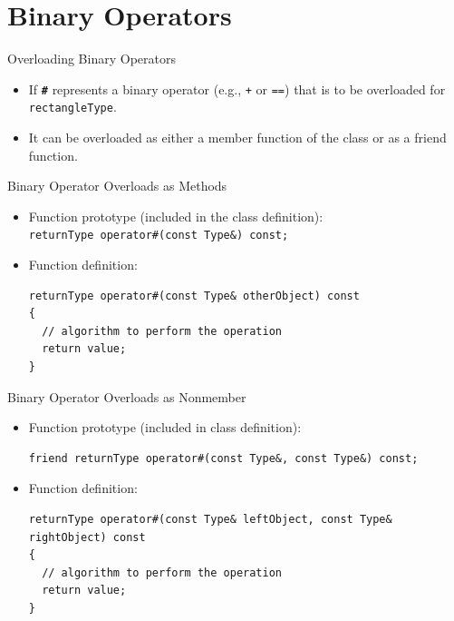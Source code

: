 \documentclass[14pt,aspectratio=1610, hyperref={pdfpagelayout=SinglePage}]{beamer}
\begin{document}
\section{Binary Operators}

\begin{frame}[fragile]{Overloading Binary Operators}
\protect\hypertarget{overloading-binary-operators}{}
\begin{itemize}
\item
  If \texttt{\textbf{\#}} represents a binary operator (e.g.,
  \lstinline{+} or \lstinline{==}) that is to be overloaded for \lstinline{rectangleType}.
\item
  It can be overloaded as either a member function of the class or as a
  friend function.
\end{itemize}
\end{frame}

\begin{frame}[fragile]{Binary Operator Overloads as Methods}
\protect\hypertarget{overloading-the-binary-operators-as-member-functions}{}
\begin{itemize}
\item
  Function prototype (included in the class definition):\\
  \lstinline{returnType operator#(const Type&) const;}
\item
  Function definition:\\
  \begin{lstlisting}[basicstyle=\ttfamily\small]
returnType operator#(const Type& otherObject) const
{
  // algorithm to perform the operation
  return value;
}
\end{lstlisting}
\end{itemize}
\end{frame}

\begin{frame}[fragile]{Binary Operator Overloads as Nonmember}
\protect\hypertarget{overloading-the-binary-operators-arithmetic-or-relational-as-nonmember-functions}{}
\begin{itemize}
\item
  Function prototype (included in class definition):
  \begin{lstlisting}
friend returnType operator#(const Type&, const Type&) const;
\end{lstlisting}
\item
  Function definition:
  \begin{lstlisting}[basicstyle=\ttfamily\small]
returnType operator#(const Type& leftObject, const Type& rightObject) const
{
  // algorithm to perform the operation
  return value;
}
\end{lstlisting}
\end{itemize}
\end{frame}
\end{document}
